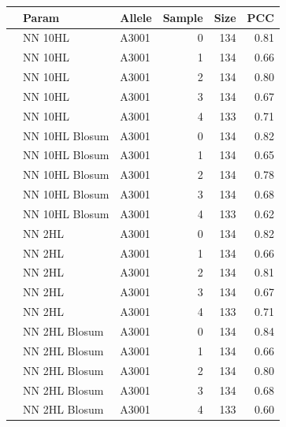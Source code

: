 \documentclass[presentation]{beamer}   %
\begin{document}
\begin{frame}
\begin{table}[hb]\scriptsize
\begin{center}
\begin{tabular}{rllrrr}
  \hline
 & Param & Allele & Sample & Size & PCC \\ 
  \hline
   & NN 10HL & A3001 &   0 & 134 & 0.81 \\ 
   & NN 10HL & A3001 &   1 & 134 & 0.66 \\ 
   & NN 10HL & A3001 &   2 & 134 & 0.80 \\ 
   & NN 10HL & A3001 &   3 & 134 & 0.67 \\ 
   & NN 10HL & A3001 &   4 & 133 & 0.71 \\ 
\hline
   & NN 10HL Blosum & A3001 &   0 & 134 & 0.82 \\ 
   & NN 10HL Blosum & A3001 &   1 & 134 & 0.65 \\ 
   & NN 10HL Blosum & A3001 &   2 & 134 & 0.78 \\ 
   & NN 10HL Blosum & A3001 &   3 & 134 & 0.68 \\ 
   & NN 10HL Blosum & A3001 &   4 & 133 & 0.62 \\ 
\hline
   & NN 2HL & A3001 &   0 & 134 & 0.82 \\ 
   & NN 2HL & A3001 &   1 & 134 & 0.66 \\ 
   & NN 2HL & A3001 &   2 & 134 & 0.81 \\ 
   & NN 2HL & A3001 &   3 & 134 & 0.67 \\ 
   & NN 2HL & A3001 &   4 & 133 & 0.71 \\ 
\hline
   & NN 2HL Blosum & A3001 &   0 & 134 & 0.84 \\ 
   & NN 2HL Blosum & A3001 &   1 & 134 & 0.66 \\ 
   & NN 2HL Blosum & A3001 &   2 & 134 & 0.80 \\ 
   & NN 2HL Blosum & A3001 &   3 & 134 & 0.68 \\ 
   & NN 2HL Blosum & A3001 &   4 & 133 & 0.60 \\ 
   \hline
\end{tabular}
\end{center}

\end{table}
\end{frame}
\end{document}
